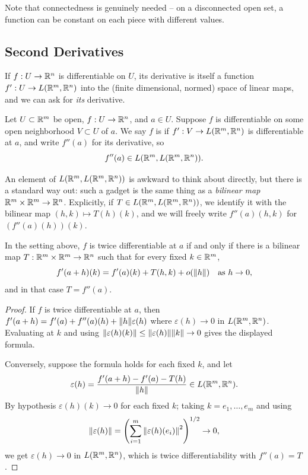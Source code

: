 \documentclass[a4paper]{scrartcl}
\begin{document}
Note that connectedness is genuinely needed -- on a disconnected open set, a function can be constant on each piece with different values.

\subsection{Second Derivatives}

If $f: U \rightarrow \mathbb{R}^n$ is differentiable on $U$, its derivative is itself a function $f': U \rightarrow L(\mathbb{R}^m, \mathbb{R}^n)$ into the (finite dimensional, normed) space of linear maps, and we can ask for \emph{its} derivative.

\begin{definition}
    Let $U \subset \mathbb{R}^m$ be open, $f: U \rightarrow \mathbb{R}^n$, and $a \in U$. Suppose $f$ is differentiable on some open neighborhood $V \subset U$ of $a$. We say $f$ is  if $f': V \rightarrow L(\mathbb{R}^m, \mathbb{R}^n)$ is differentiable at $a$, and write $f''(a)$ for its derivative, so
    $$
    f''(a) \in L(\mathbb{R}^m, L(\mathbb{R}^m, \mathbb{R}^n)).
    $$
\end{definition}

An element of $L(\mathbb{R}^m, L(\mathbb{R}^m, \mathbb{R}^n))$ is awkward to think about directly, but there is a standard way out: such a gadget is the same thing as a \emph{bilinear map} $\mathbb{R}^m \times \mathbb{R}^m \rightarrow \mathbb{R}^n$. Explicitly, if $T \in L(\mathbb{R}^m, L(\mathbb{R}^m, \mathbb{R}^n))$, we identify it with the bilinear map $(h, k) \mapsto T(h)(k)$, and we will freely write $f''(a)(h, k)$ for $\left(f''(a)(h)\right)(k)$.

\begin{proposition}
    In the setting above, $f$ is twice differentiable at $a$ if and only if there is a bilinear map $T: \mathbb{R}^m \times \mathbb{R}^m \rightarrow \mathbb{R}^n$ such that for every fixed $k \in \mathbb{R}^m$,
    $$
    f'(a + h)(k) = f'(a)(k) + T(h, k) + o(\norm{h}) \quad \text{as } h \rightarrow 0,
    $$
    and in that case $T = f''(a)$.
\end{proposition}
\begin{proof}
    If $f$ is twice differentiable at $a$, then $f'(a + h) = f'(a) + f''(a)(h) + \norm{h}\varepsilon(h)$ where $\varepsilon(h) \rightarrow 0$ in $L(\mathbb{R}^m, \mathbb{R}^n)$. Evaluating at $k$ and using $\norm{\varepsilon(h)(k)} \leq \norm{\varepsilon(h)}\norm{k} \rightarrow 0$ gives the displayed formula.

    Conversely, suppose the formula holds for each fixed $k$, and let
    $$
    \varepsilon(h) = \frac{f'(a + h) - f'(a) - T(h)}{\norm{h}} \in L(\mathbb{R}^m, \mathbb{R}^n).
    $$
    By hypothesis $\varepsilon(h)(k) \rightarrow 0$ for each fixed $k$; taking $k = e_1, \dots, e_m$ and using
    $$
    \norm{\varepsilon(h)} = \left(\sum_{i = 1}^m \norm{\varepsilon(h)(e_i)}^2\right)^{1/2} \rightarrow 0,
    $$
    we get $\varepsilon(h) \rightarrow 0$ in $L(\mathbb{R}^m, \mathbb{R}^n)$, which is twice differentiability with $f''(a) = T$.
\end{proof}
\end{document}
